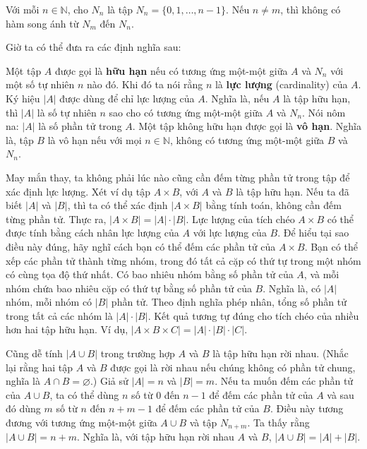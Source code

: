 \begin{theorem}
Với mỗi $n \in \mathbb{N}$, cho $N_n$ là tập $N_n = \{0,1,\ldots,n-1\}$. Nếu $n \neq m$, thì không có hàm song ánh từ $N_m$ đến $N_n$.
\end{theorem}

Giờ ta có thể đưa ra các định nghĩa sau:

\begin{definition}
Một tập $A$ được gọi là \textbf{hữu hạn} nếu có tương ứng một-một giữa $A$ và $N_n$ với một số tự nhiên $n$ nào đó. Khi đó ta nói rằng $n$ là \textbf{lực lượng} (cardinality) của $A$. Ký hiệu $|A|$ được dùng để chỉ lực lượng của $A$. Nghĩa là, nếu $A$ là tập hữu hạn, thì $|A|$ là số tự nhiên $n$ sao cho có tương ứng một-một giữa $A$ và $N_n$. Nói nôm na: $|A|$ là số phần tử trong $A$. Một tập không hữu hạn được gọi là \textbf{vô hạn}. Nghĩa là, tập $B$ là vô hạn nếu với mọi $n \in \mathbb{N}$, không có tương ứng một-một giữa $B$ và $N_n$.
\end{definition}

May mắn thay, ta không phải lúc nào cũng cần đếm từng phần tử trong tập để xác định lực lượng. Xét ví dụ tập $A \times B$, với $A$ và $B$ là tập hữu hạn. Nếu ta đã biết $|A|$ và $|B|$, thì ta có thể xác định $|A \times B|$ bằng tính toán, không cần đếm từng phần tử. Thực ra, $|A \times B| = |A| \cdot |B|$. Lực lượng của tích chéo $A \times B$ có thể được tính bằng cách nhân lực lượng của $A$ với lực lượng của $B$. Để hiểu tại sao điều này đúng, hãy nghĩ cách bạn có thể đếm các phần tử của $A \times B$. Bạn có thể xếp các phần tử thành từng nhóm, trong đó tất cả cặp có thứ tự trong một nhóm có cùng tọa độ thứ nhất. Có bao nhiêu nhóm bằng số phần tử của $A$, và mỗi nhóm chứa bao nhiêu cặp có thứ tự bằng số phần tử của $B$. Nghĩa là, có $|A|$ nhóm, mỗi nhóm có $|B|$ phần tử. Theo định nghĩa phép nhân, tổng số phần tử trong tất cả các nhóm là $|A| \cdot |B|$. Kết quả tương tự đúng cho tích chéo của nhiều hơn hai tập hữu hạn. Ví dụ, $|A \times B \times C| = |A| \cdot |B| \cdot |C|$.

Cũng dễ tính $|A \cup B|$ trong trường hợp $A$ và $B$ là tập hữu hạn rời nhau. (Nhắc lại rằng hai tập $A$ và $B$ được gọi là rời nhau nếu chúng không có phần tử chung, nghĩa là $A \cap B = \varnothing$.) Giả sử $|A| = n$ và $|B| = m$. Nếu ta muốn đếm các phần tử của $A \cup B$, ta có thể dùng $n$ số từ $0$ đến $n-1$ để đếm các phần tử của $A$ và sau đó dùng $m$ số từ $n$ đến $n+m-1$ để đếm các phần tử của $B$. Điều này tương đương với tương ứng một-một giữa $A \cup B$ và tập $N_{n+m}$. Ta thấy rằng $|A \cup B| = n + m$. Nghĩa là, với tập hữu hạn rời nhau $A$ và $B$, $|A \cup B| = |A| + |B|$.

